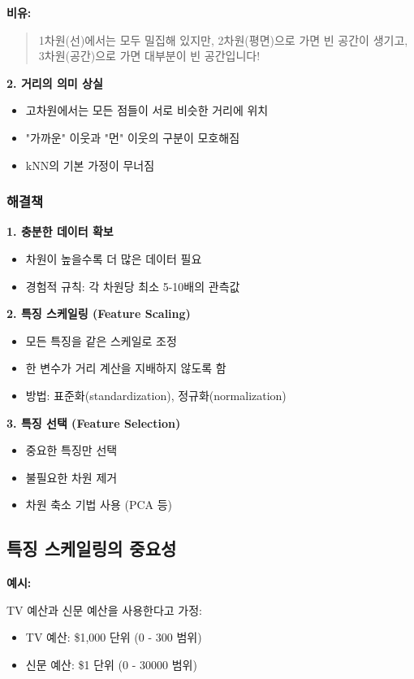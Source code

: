 \documentclass[12pt,a4paper]{article}
\begin{document}
\textbf{비유:}
\begin{quote}
1차원(선)에서는 모두 밀집해 있지만,
2차원(평면)으로 가면 빈 공간이 생기고,
3차원(공간)으로 가면 대부분이 빈 공간입니다!
\end{quote}

\textbf{2. 거리의 의미 상실}
\begin{itemize}
    \item 고차원에서는 모든 점들이 서로 비슷한 거리에 위치
    \item "가까운" 이웃과 "먼" 이웃의 구분이 모호해짐
    \item kNN의 기본 가정이 무너짐
\end{itemize}

\subsubsection{해결책}

\textbf{1. 충분한 데이터 확보}
\begin{itemize}
    \item 차원이 높을수록 더 많은 데이터 필요
    \item 경험적 규칙: 각 차원당 최소 5-10배의 관측값
\end{itemize}

\textbf{2. 특징 스케일링 (Feature Scaling)}
\begin{itemize}
    \item 모든 특징을 같은 스케일로 조정
    \item 한 변수가 거리 계산을 지배하지 않도록 함
    \item 방법: 표준화(standardization), 정규화(normalization)
\end{itemize}

\textbf{3. 특징 선택 (Feature Selection)}
\begin{itemize}
    \item 중요한 특징만 선택
    \item 불필요한 차원 제거
    \item 차원 축소 기법 사용 (PCA 등)
\end{itemize}

\subsection{특징 스케일링의 중요성}

\textbf{예시:}

TV 예산과 신문 예산을 사용한다고 가정:
\begin{itemize}
    \item TV 예산: \$1,000 단위 (0 - 300 범위)
    \item 신문 예산: \$1 단위 (0 - 30000 범위)
\end{itemize}
\end{document}
